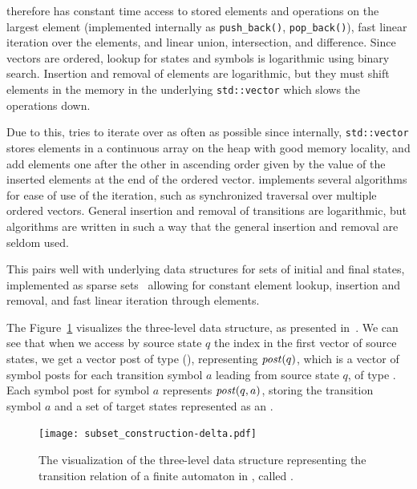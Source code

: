 \ordvector therefore has constant time access to stored elements and operations on the largest element (implemented internally as \texttt{push\_back()}, \texttt{pop\_back()}), fast linear iteration over the elements, and linear union, intersection, and difference.
Since vectors are ordered, lookup for states and symbols is logarithmic using binary search.
Insertion and removal of elements are logarithmic, but they must shift elements in the memory in the underlying \texttt{std::vector} which slows the operations down.

Due to this, \mata tries to iterate over \ordvector as often as possible since internally, \texttt{std::vector} stores elements in a continuous array on the heap with good memory locality, and add elements one after the other in ascending order given by the value of the inserted elements at the end of the ordered vector.
\mata implements several algorithms for ease of use of the iteration, such as synchronized traversal over multiple ordered vectors.
General insertion and removal of transitions are logarithmic, but \mata algorithms are written in such a way that the general insertion and removal are seldom used.

This pairs well with underlying data structures for sets of initial and final states, implemented as sparse sets~\cite{sparseset93} allowing for constant element lookup, insertion and removal, and fast linear iteration through elements.

The Figure~\ref{fig:delta_struct} visualizes the three-level \deltastruct data structure, as presented in~\cite{tacas24_mata_10.1007/978-3-031-57249-4_7}.
We can see that when we access by source state $q$ the index in the first vector of source states, we get a vector post of type \statepost (\statepost[q]), representing $\mathit{post}(q)$, which is a vector of symbol posts for each transition symbol $a$ leading from source state $q$, of type \symbolpost.
Each symbol post for symbol $a$ represents $\mathit{post}(q, a)$, storing the transition symbol $a$ and a set of target states represented as an \ordvector.

\begin{figure}[ht]
  \centering
  \texttt{[image: subset\_construction-delta.pdf]}
\caption{
The visualization of the three-level data structure representing the transition relation of a finite automaton in \mata, called \deltastruct.
}
\label{fig:delta_struct}
\end{figure}

